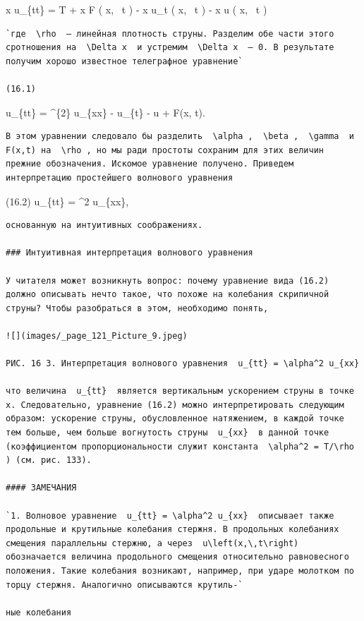 \documentclass[
  ukrainian,
]{article}
\begin{document}
\Delta x \rho u\_\{tt\} = T
 +
\Delta x F \left( x, ~t \right) - \Delta x \beta u\_t \left( x, ~t
\right) - \Delta x \gamma u \left( x, ~t \right)

\begin{verbatim}
`где  \rho  — линейная плотность струны. Разделим обе части этого сротношения на  \Delta x  и устремим  \Delta x  — 0. В результате получим хорошо известное телеграфное уравнение`

(16.1)
\end{verbatim}

u\_\{tt\} = \alpha\^{}\{2\} u\_\{xx\} - \beta u\_\{t\} - \gamma u + F(x,
t).

\begin{verbatim}
В этом уравнении следовало бы разделить  \alpha ,  \beta ,  \gamma  и F(x,t) на  \rho , но мы ради простоты сохраним для этих величин прежние обозначения. Искомое уравнение получено. Приведем интерпретацию простейшего волнового уравнения
\end{verbatim}

(16.2) u\_\{tt\} = \alpha\^{}2 u\_\{xx\},

\begin{verbatim}
основанную на интуитивных соображениях.

### Интуитивная интерпретация волнового уравнения

У читателя может возникнуть вопрос: почему уравнение вида (16.2) должно описывать нечто такое, что похоже на колебания скрипичной струны? Чтобы разобраться в этом, необходимо понять,

![](images/_page_121_Picture_9.jpeg)

РИС. 16 3. Интерпретация волнового уравнения  u_{tt} = \alpha^2 u_{xx} 

что величина  u_{tt}  является вертикальным ускорением струны в точке x. Следовательно, уравнение (16.2) можно интерпретировать следующим образом: ускорение струны, обусловленное натяжением, в каждой точке тем больше, чем больше вогнутость струны  u_{xx}  в данной точке (коэффициентом пропорциональности служит константа  \alpha^2 = T/\rho ) (см. рис. 133).

#### ЗАМЕЧАНИЯ

`1. Волновое уравнение  u_{tt} = \alpha^2 u_{xx}  описывает также продольные и крутильные колебания стержня. В продольных колебаниях смещения параллельны стержню, а через  u\left(x,\,t\right)  обозначается величина продольного смещения относительно равновесного положения. Такие колебания возникают, например, при ударе молотком по торцу стержня. Аналогично описываются крутиль-`

ные колебания
\end{verbatim}
\end{document}
